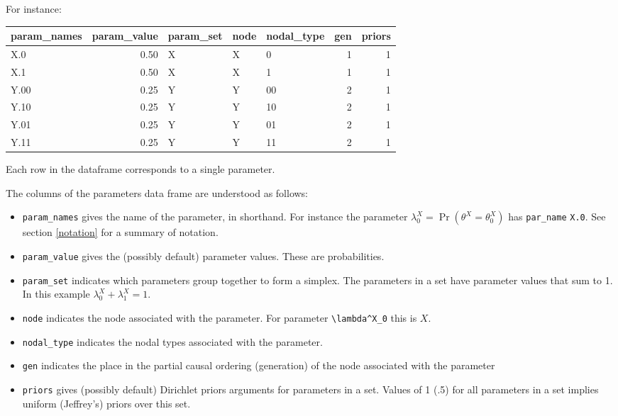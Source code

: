 \documentclass[
  12pt,
]{book}
\newenvironment{Shaded}{\begin{snugshade}}{\end{snugshade}}
\newcommand{\KeywordTok}[1]{\textcolor[rgb]{0.13,0.29,0.53}{\textbf{#1}}}
\newcommand{\NormalTok}[1]{#1}
\newcommand{\OperatorTok}[1]{\textcolor[rgb]{0.81,0.36,0.00}{\textbf{#1}}}
\newcommand{\StringTok}[1]{\textcolor[rgb]{0.31,0.60,0.02}{#1}}
\providecommand{\tightlist}{%
  \setlength{\itemsep}{0pt}\setlength{\parskip}{0pt}}
\begin{document}
For instance:

\begin{Shaded}
\end{Shaded}

\begin{tabular}{l|r|l|l|l|r|r}
\hline
param\_names & param\_value & param\_set & node & nodal\_type & gen & priors\\
\hline
X.0 & 0.50 & X & X & 0 & 1 & 1\\
\hline
X.1 & 0.50 & X & X & 1 & 1 & 1\\
\hline
Y.00 & 0.25 & Y & Y & 00 & 2 & 1\\
\hline
Y.10 & 0.25 & Y & Y & 10 & 2 & 1\\
\hline
Y.01 & 0.25 & Y & Y & 01 & 2 & 1\\
\hline
Y.11 & 0.25 & Y & Y & 11 & 2 & 1\\
\hline
\end{tabular}

Each row in the dataframe corresponds to a single parameter.

The columns of the parameters data frame are understood as follows:

\begin{itemize}
\tightlist
\item
  \texttt{param\_names} gives the name of the parameter, in shorthand. For instance the parameter \(\lambda^X_0 = \Pr(\theta^X = \theta^X_0)\) has \texttt{par\_name} \texttt{X.0}. See section \ref{notation} for a summary of notation.
\item
  \texttt{param\_value} gives the (possibly default) parameter values. These are probabilities.\\
\item
  \texttt{param\_set} indicates which parameters group together to form a simplex. The parameters in a set have parameter values that sum to 1. In this example \(\lambda^X_0 + \lambda^X_1 = 1\).
\item
  \texttt{node} indicates the node associated with the parameter. For parameter \texttt{\textbackslash{}lambda\^{}X\_0} this is \(X\).
\item
  \texttt{nodal\_type} indicates the nodal types associated with the parameter.
\item
  \texttt{gen} indicates the place in the partial causal ordering (generation) of the node associated with the parameter
\item
  \texttt{priors} gives (possibly default) Dirichlet priors arguments for parameters in a set. Values of 1 (.5) for all parameters in a set implies uniform (Jeffrey's) priors over this set.
\end{itemize}
\end{document}

